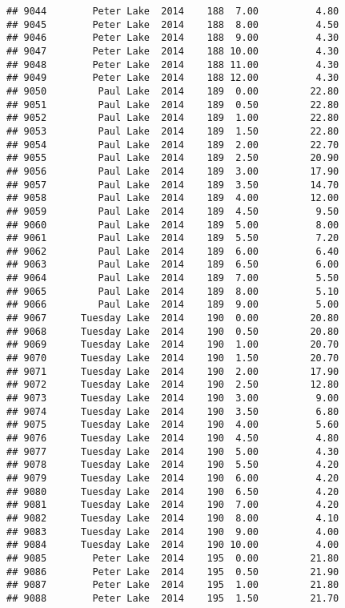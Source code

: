 \documentclass[
]{article}
\begin{document}
\begin{verbatim}
## 9044        Peter Lake  2014    188  7.00          4.80
## 9045        Peter Lake  2014    188  8.00          4.50
## 9046        Peter Lake  2014    188  9.00          4.30
## 9047        Peter Lake  2014    188 10.00          4.30
## 9048        Peter Lake  2014    188 11.00          4.30
## 9049        Peter Lake  2014    188 12.00          4.30
## 9050         Paul Lake  2014    189  0.00         22.80
## 9051         Paul Lake  2014    189  0.50         22.80
## 9052         Paul Lake  2014    189  1.00         22.80
## 9053         Paul Lake  2014    189  1.50         22.80
## 9054         Paul Lake  2014    189  2.00         22.70
## 9055         Paul Lake  2014    189  2.50         20.90
## 9056         Paul Lake  2014    189  3.00         17.90
## 9057         Paul Lake  2014    189  3.50         14.70
## 9058         Paul Lake  2014    189  4.00         12.00
## 9059         Paul Lake  2014    189  4.50          9.50
## 9060         Paul Lake  2014    189  5.00          8.00
## 9061         Paul Lake  2014    189  5.50          7.20
## 9062         Paul Lake  2014    189  6.00          6.40
## 9063         Paul Lake  2014    189  6.50          6.00
## 9064         Paul Lake  2014    189  7.00          5.50
## 9065         Paul Lake  2014    189  8.00          5.10
## 9066         Paul Lake  2014    189  9.00          5.00
## 9067      Tuesday Lake  2014    190  0.00         20.80
## 9068      Tuesday Lake  2014    190  0.50         20.80
## 9069      Tuesday Lake  2014    190  1.00         20.70
## 9070      Tuesday Lake  2014    190  1.50         20.70
## 9071      Tuesday Lake  2014    190  2.00         17.90
## 9072      Tuesday Lake  2014    190  2.50         12.80
## 9073      Tuesday Lake  2014    190  3.00          9.00
## 9074      Tuesday Lake  2014    190  3.50          6.80
## 9075      Tuesday Lake  2014    190  4.00          5.60
## 9076      Tuesday Lake  2014    190  4.50          4.80
## 9077      Tuesday Lake  2014    190  5.00          4.30
## 9078      Tuesday Lake  2014    190  5.50          4.20
## 9079      Tuesday Lake  2014    190  6.00          4.20
## 9080      Tuesday Lake  2014    190  6.50          4.20
## 9081      Tuesday Lake  2014    190  7.00          4.20
## 9082      Tuesday Lake  2014    190  8.00          4.10
## 9083      Tuesday Lake  2014    190  9.00          4.00
## 9084      Tuesday Lake  2014    190 10.00          4.00
## 9085        Peter Lake  2014    195  0.00         21.80
## 9086        Peter Lake  2014    195  0.50         21.90
## 9087        Peter Lake  2014    195  1.00         21.80
## 9088        Peter Lake  2014    195  1.50         21.70

\end{verbatim}
\end{document}
